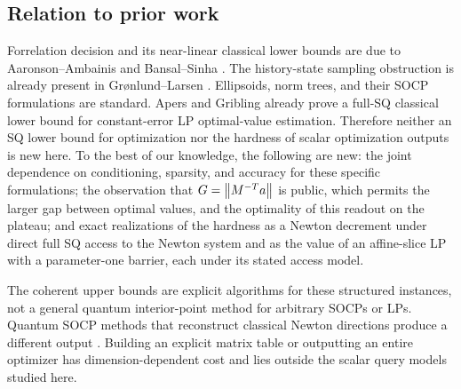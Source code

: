 \subsection{Relation to prior work}

Forrelation decision and its near-linear classical lower bounds are due
to Aaronson--Ambainis and Bansal--Sinha
\citep{AaronsonAmbainis2018,BansalSinha2021}.  The history-state sampling
obstruction is already present in Gr\o nlund--Larsen
\citep{GronlundLarsen2025}.  Ellipsoids, norm trees, and their SOCP
formulations are standard.  Apers and Gribling
\citep[Lemma 8.5]{ApersGribling2026} already prove a full-SQ classical
lower bound for constant-error LP optimal-value estimation.  Therefore
neither an SQ lower bound for optimization nor the hardness of scalar
optimization outputs is new here.  To the best of our knowledge, the
following are new: the joint dependence on conditioning, sparsity, and
accuracy for these specific formulations; the observation that
$G=\left\lVert M^{-T}a\right\rVert$ is public, which permits the larger gap between
optimal values, and the optimality of this readout on the
plateau; and exact realizations of the hardness as a Newton decrement under
direct full SQ access to the Newton system and as the value of an
affine-slice LP with a parameter-one barrier, each under its stated
access model.

The coherent upper bounds are explicit algorithms for these structured
instances, not a general quantum interior-point method for
arbitrary SOCPs or LPs.  Quantum SOCP methods that reconstruct classical
Newton directions produce a different output
\citep{KerenidisPrakashSzilagyi2021}.  Building an explicit matrix table
or outputting an entire optimizer has dimension-dependent cost and lies
outside the scalar query models studied here.
